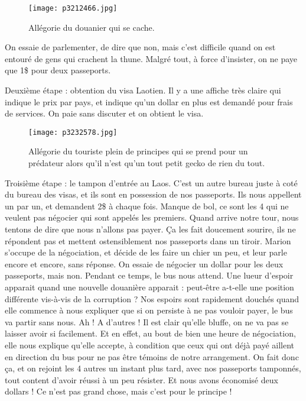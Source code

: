 \documentclass{book}
\begin{document}
\begin{figure}[h]
\centering
\texttt{[image: p3212466.jpg]}
\caption*{Allégorie du douanier qui se cache.}
\end{figure}

On essaie de parlementer, de dire que non, mais c'est difficile quand on est entouré de gens qui crachent la thune. Malgré tout, à force d'insister, on ne paye que 1\$ pour deux passeports.

Deuxième étape : obtention du visa Laotien. Il y a une affiche très claire qui indique le prix par pays, et indique qu'un dollar en plus est demandé pour frais de services. On paie sans discuter et on obtient le visa.


\begin{figure}[h]
\centering
\texttt{[image: p3232578.jpg]}
\caption*{Allégorie du touriste plein de principes qui se prend pour un prédateur alors qu'il n'est qu'un tout petit gecko de rien du tout.}
\end{figure}

Troisième étape : le tampon d'entrée au Laos. C'est un autre bureau juste à coté du bureau des visas, et ils sont en possession de nos passeports. Ils nous appellent un par un, et demandent 2\$ à chaque fois. Manque de bol, ce sont les 4 qui ne veulent pas négocier qui sont appelés les premiers. Quand arrive notre tour, nous tentons de dire que nous n'allons pas payer. Ça les fait doucement sourire, ils ne répondent pas et mettent ostensiblement nos passeports dans un tiroir. Marion s'occupe de la négociation, et décide de les faire un chier un peu, et leur parle encore et encore, sans réponse. On essaie de négocier un dollar pour les deux passeports, mais non. Pendant ce temps, le bus nous attend. Une lueur d'espoir apparait quand une nouvelle douanière apparait : peut-être a-t-elle une position différente vis-à-vis de la corruption ? Nos espoirs sont rapidement douchés quand elle commence à nous expliquer que si on persiste à ne pas vouloir payer, le bus va partir sans nous. Ah ! A d'autres ! Il est clair qu'elle bluffe, on ne va pas se laisser avoir si facilement. Et en effet, au bout de bien une heure de négociation, elle nous explique qu'elle accepte, à condition que ceux qui ont déjà payé aillent en direction du bus pour ne pas être témoins de notre arrangement. On fait donc ça, et on rejoint les 4 autres un instant plus tard, avec nos passeports tamponnés, tout content d'avoir réussi à un peu résister. Et nous avons économisé deux dollars ! Ce n'est pas grand chose, mais c'est pour le principe !
\end{document}
